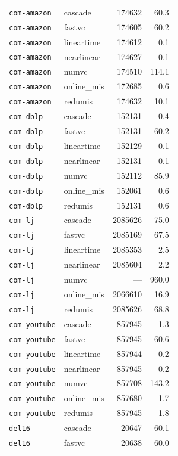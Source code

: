 \begin{longtable}{l l r r}
\texttt{com-amazon} & cascade & 174632 & 60.3 \\
\texttt{com-amazon} & fastvc & 174605 & 60.2 \\
\texttt{com-amazon} & lineartime & 174612 & 0.1 \\
\texttt{com-amazon} & nearlinear & 174627 & 0.1 \\
\texttt{com-amazon} & numvc & 174510 & 114.1 \\
\texttt{com-amazon} & online\_mis & 172685 & 0.6 \\
\texttt{com-amazon} & redumis & 174632 & 10.1 \\
\texttt{com-dblp} & cascade & 152131 & 0.4 \\
\texttt{com-dblp} & fastvc & 152131 & 60.2 \\
\texttt{com-dblp} & lineartime & 152129 & 0.1 \\
\texttt{com-dblp} & nearlinear & 152131 & 0.1 \\
\texttt{com-dblp} & numvc & 152112 & 85.9 \\
\texttt{com-dblp} & online\_mis & 152061 & 0.6 \\
\texttt{com-dblp} & redumis & 152131 & 0.6 \\
\texttt{com-lj} & cascade & 2085626 & 75.0 \\
\texttt{com-lj} & fastvc & 2085169 & 67.5 \\
\texttt{com-lj} & lineartime & 2085353 & 2.5 \\
\texttt{com-lj} & nearlinear & 2085604 & 2.2 \\
\texttt{com-lj} & numvc & --- & 960.0 \\
\texttt{com-lj} & online\_mis & 2066610 & 16.9 \\
\texttt{com-lj} & redumis & 2085626 & 68.8 \\
\texttt{com-youtube} & cascade & 857945 & 1.3 \\
\texttt{com-youtube} & fastvc & 857945 & 60.6 \\
\texttt{com-youtube} & lineartime & 857944 & 0.2 \\
\texttt{com-youtube} & nearlinear & 857945 & 0.2 \\
\texttt{com-youtube} & numvc & 857708 & 143.2 \\
\texttt{com-youtube} & online\_mis & 857680 & 1.7 \\
\texttt{com-youtube} & redumis & 857945 & 1.8 \\
\texttt{del16} & cascade & 20647 & 60.1 \\
\texttt{del16} & fastvc & 20638 & 60.0 \\

\end{longtable}
